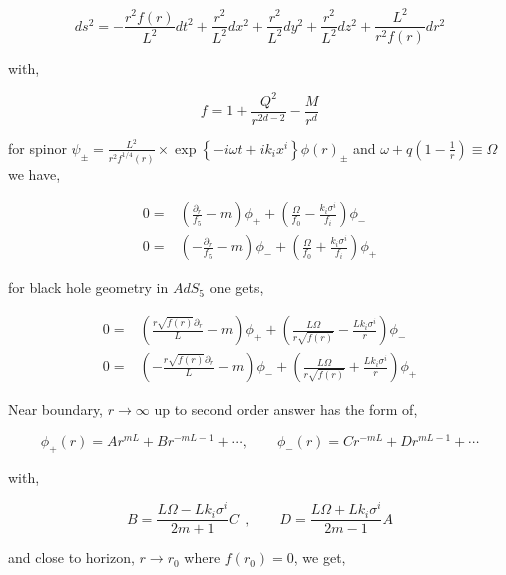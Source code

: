 \begin{equation}
   ds^2 = -\frac{r^2f(r)}{L^2}dt^2 + \frac{r^2}{L^2}dx^2 + \frac{r^2}{L^2}dy^2 + \frac{r^2}{L^2}dz^2 + \frac{L^2}{r^2f(r)}dr^2 
\end{equation}

with,

\begin{equation}
   f = 1 + \frac{Q^2}{r^{2d-2}} - \frac{M}{r^d}
\end{equation}

for spinor $\psi_{\pm} = \frac{L^2}{r^2f^{1/4}(r)}\times\exp\left\{-i\omega t +ik_ix^i\right\}\phi(r)_{\pm}$ and $\omega + q(1-\frac{1}{r}) \equiv \Omega$  we have,

\begin{align}
    0 =& \left( \frac{\partial_r}{f_5} - m \right) \phi_{+} + \left( \frac{\Omega}{f_0} - \frac{k_i\sigma^i}{f_i} \right) \phi_{-} \nonumber\\
    0 =& \left( - \frac{\partial_r}{f_5} - m \right) \phi_{-} + \left( \frac{\Omega}{f_0} + \frac{k_i\sigma^i}{f_i} \right) \phi_{+}
\end{align}

for black hole geometry in $AdS_5$ one gets,

\begin{align} \label{eq:DiracEquationinBlackHoleAdS5}
    0 =& \left( \frac{r\sqrt{f(r)}\partial_r}{L} - m \right) \phi_{+} + \left( \frac{L\Omega}{r\sqrt{f(r)}} - \frac{Lk_i\sigma^i}{r} \right) \phi_{-} \nonumber\\
    0 =& \left(-\frac{r\sqrt{f(r)}\partial_r}{L} - m \right) \phi_{-} + \left( \frac{L\Omega}{r\sqrt{f(r)}} + \frac{Lk_i\sigma^i}{r} \right) \phi_{+}
\end{align}

Near boundary, $r\rightarrow\infty$ up to second order answer has the form of,

\begin{equation} \label{eq:NearBoundaryAdS5BlackHoleDiracEquation}
   \phi_{+}(r) = Ar^{mL} + Br^{-mL-1} + \cdots, \qquad \phi_{-}(r) = Cr^{-mL} + Dr^{mL-1} + \cdots
\end{equation}

with,

\begin{equation}
   B = \frac{L\Omega - Lk_i\sigma^i}{2m + 1}C ~~, \qquad D = \frac{L\Omega + Lk_i\sigma^i}{2m-1}A
\end{equation}

and close to horizon, $r\rightarrow r_0$ where $f(r_0) = 0$, we get,

